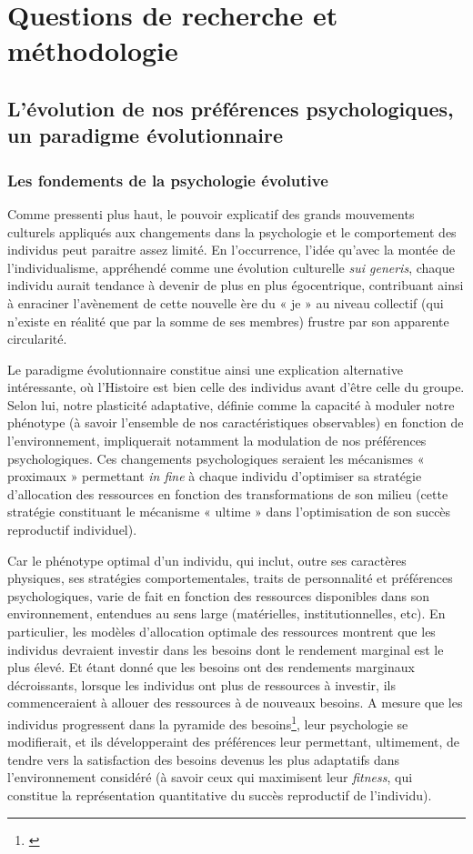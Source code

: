
\part{Questions de recherche et méthodologie}

\chapter{L’évolution de nos préférences psychologiques, un paradigme évolutionnaire}

\section{Les fondements de la psychologie évolutive}

Comme pressenti plus haut, le pouvoir explicatif des grands mouvements culturels appliqués aux changements dans la psychologie et le comportement des individus peut paraitre assez limité. En l’occurrence, l'idée qu'avec la montée de l'individualisme, appréhendé comme une évolution culturelle \textit{sui generis}, chaque individu aurait tendance à devenir de plus en plus égocentrique, contribuant ainsi à enraciner l'avènement de cette nouvelle ère du « je » au niveau collectif (qui n’existe en réalité que par la somme de ses membres) frustre par son apparente circularité.

Le paradigme évolutionnaire constitue ainsi une explication alternative intéressante, où l'Histoire est bien celle des individus avant d’être celle du groupe. Selon lui, notre plasticité adaptative, définie comme la capacité à moduler notre phénotype (à savoir l'ensemble de nos caractéristiques observables) en fonction de l'environnement, impliquerait notamment la modulation de nos préférences psychologiques. Ces changements psychologiques seraient les mécanismes « proximaux » permettant \textit{in fine} à chaque individu d'optimiser sa stratégie d'allocation des ressources en fonction des transformations de son milieu (cette stratégie constituant le mécanisme « ultime » dans l'optimisation de son succès reproductif individuel).

Car le phénotype optimal d'un individu, qui inclut, outre ses caractères physiques, ses stratégies comportementales, traits de personnalité et préférences psychologiques, varie de fait en fonction des ressources disponibles dans son environnement, entendues au sens large (matérielles, institutionnelles, etc). En particulier, les modèles d'allocation optimale des ressources montrent que les individus devraient investir dans les besoins dont le rendement marginal est le plus élevé. Et étant donné que les besoins ont des rendements marginaux décroissants, lorsque les individus ont plus de ressources à investir, ils commenceraient à allouer des ressources à de nouveaux besoins. A mesure que les individus progressent dans la pyramide des besoins\footnote{\cite{maslow_theory_1943}}, leur psychologie se modifierait, et ils développeraint des préférences leur permettant, ultimement, de tendre vers la satisfaction des besoins devenus les plus adaptatifs dans l'environnement considéré (à savoir ceux qui maximisent leur \textit{fitness}, qui constitue la représentation quantitative du succès reproductif de l'individu).

